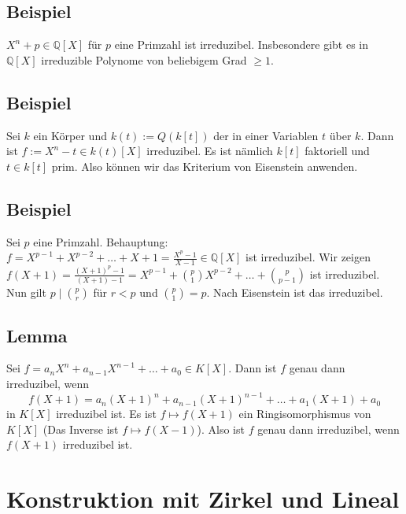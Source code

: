 \subsection[{Beispiel: In $\mathds{Q}[X]$ existieren irreduzible Polynome von beliebigem Grad}]{Beispiel} %
\label{sub:96}
$X^n +p \in \mathds{Q}[X]$ für $p$ eine Primzahl ist irreduzibel. Insbesondere gibt es in $\mathds{Q}[X]$ irreduzible Polynome von beliebigem Grad $\ge 1$.

\subsection[Beispiel: Körper der rationalen Funktionen]{Beispiel} %
\label{sub:97}
Sei $k$ ein Körper und $k(t) := Q(k[t])$ der  in einer Variablen $t$ über $k$. Dann ist $f := X^n - t \in k(t)[X]$ irreduzibel.
Es ist nämlich $k[t]$ faktoriell und $t \in k[t]$ prim. Also können wir das Kriterium von Eisenstein anwenden.

\subsection[Beispiel: Wenn $f$ irreduzibel, dann ist auch $f(X+1)$ irreduzibel]{Beispiel} %
\label{sub:98} 
Sei $p$ eine Primzahl. Behauptung: $f = X^{p-1}+ X^{p-2} + \ldots + X + 1 = \frac{X^p -1}{X-1} \in \mathds{Q}[X]$ ist irreduzibel. Wir zeigen 
$f(X+1) = \frac{(X+1)^p -1}{(X+1) -1} = X^{p-1} + \binom{p}{1} X^{p-2} + \ldots + \binom{p}{p-1}$ ist irreduzibel. Nun gilt $p \mid \binom{p}{r}$ für $r <p$ und 
$\binom{p}{1} =p$. Nach Eisenstein ist das irreduzibel.

\subsection[Lemma: $f$ irreduzibel $\iff$ $f(X+1)$ irreduzibel]{Lemma} %
\label{sub:99}
Sei $f = a_n X^n + a_{n-1} X^{n-1} + \ldots + a_0 \in K[X]$. Dann ist $f$ genau dann irreduzibel, wenn 
\[
	f(X+1) = a_n (X+1)^n + a_{n-1} (X+1)^{n-1} + \ldots + a_1 (X+1) +a_0
\]
in $K[X]$ irreduzibel ist.
Es ist $f \mapsto f(X+1)$ ein Ringisomorphismus von $K[X]$ (Das Inverse ist $f \mapsto f(X-1)$). Also ist $f$ genau dann irreduzibel, wenn $f(X+1)$ irreduzibel ist.
\bewende
\newpage


\section{Konstruktion mit Zirkel und Lineal} %
\label{sec:10}
